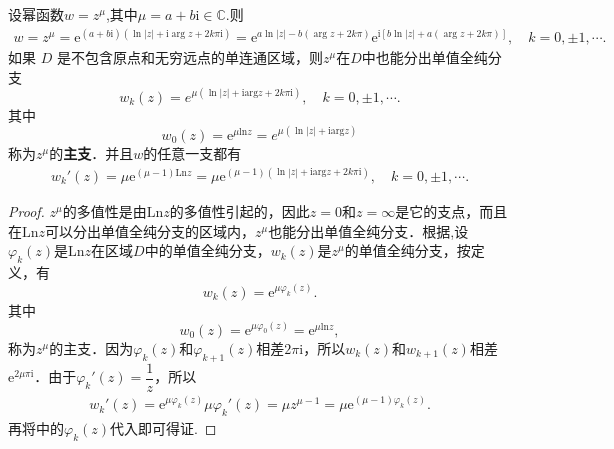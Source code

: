 \documentclass[../../main.tex]{subfiles}%
\begin{document}
\begin{theorem}\label{theorem:复变函数--幂函数的基本性质}
设幂函数$w=z^\mu$,其中$\mu=a+b\mathrm{i}\in \mathbb{C}$.则
\begin{align*}
w = z^\mu = \text{e}^{(a + b\text{i})(\ln |z| + \text{i}\arg z + 2k\pi \text{i})}
= \text{e}^{a\ln |z| - b(\arg z + 2k\pi)} \text{e}^{\text{i}[b\ln |z| + a(\arg z + 2k\pi)]},\quad
k = 0, \pm 1, \cdots.
\end{align*}
如果 \( D \) 是不包含原点和无穷远点的单连通区域，则$z^\mu$在$D$中也能分出单值全纯分支
\[
w_k(z)=e^{\mu (\ln \left| z \right|+\mathrm{iarg}z+2k\pi \mathrm{i})},\quad k=0,\pm 1,\cdots .
\]
其中
\[
w_0(z) = \text{e}^{\mu  \mathrm{ln} z}=e^{\mu (\ln \left| z \right|+\mathrm{iarg}z)}
\]
称为$z^\mu$的\textbf{主支}．并且$w$的任意一支都有
\begin{align}\label{equation:幂函数求导}
w_k'(z) =\mu \mathrm{e}^{\left( \mu -1 \right) \mathrm{Ln}z}=\mu \mathrm{e}^{(\mu -1)(\ln \left| z \right|+\mathrm{iarg}z+2k\pi \mathrm{i})},\quad k=0,\pm 1,\cdots .
\end{align}
\end{theorem}
\begin{proof}
$z^\mu$的多值性是由$\mathrm{Ln} z$的多值性引起的，因此$z = 0$和$z = \infty$是它的支点，而且在$\mathrm{Ln} z$可以分出单值全纯分支的区域内，$z^\mu$也能分出单值全纯分支．根据,设$\varphi_k(z)$是$\mathrm{Ln} z$在区域$D$中的单值全纯分支，$w_k(z)$是$z^\mu$的单值全纯分支，按定义，有
\[
w_k(z) = \text{e}^{\mu \varphi_k(z)}.
\]
其中
\[
w_0(z) = \text{e}^{\mu \varphi_0(z)} = \text{e}^{\mu  \mathrm{ln} z},
\]
称为$z^\mu$的主支．因为$\varphi_k(z)$和$\varphi_{k + 1}(z)$相差$2\pi \text{i}$，所以$w_k(z)$和$w_{k + 1}(z)$相差$\text{e}^{2\mu \pi \text{i}}$．由于$\varphi_k'(z) = \dfrac{1}{z}$，所以
\begin{align*}
w_k'(z) = \text{e}^{\mu \varphi_k(z)} \mu \varphi_k'(z)
= \mu z^{\mu - 1}
= \mu \text{e}^{(\mu - 1)\varphi_k(z)}.
\end{align*}
再将中的$\varphi_k(z)$代入即可得证.
\end{proof}
\end{document}
